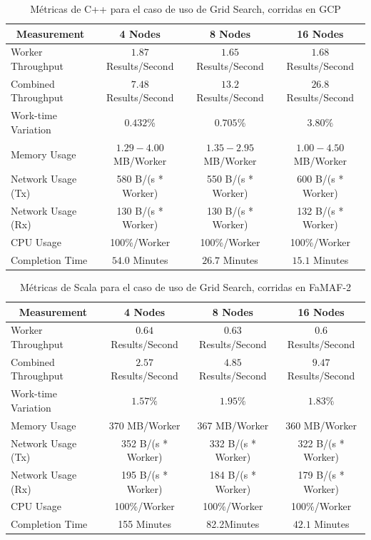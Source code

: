 \documentclass[11pt]{article}
\newcommand{\gscap}[2]{\caption{Métricas de #1 para el caso de uso de Grid Search, corridas en #2}}
\begin{document}
\begin{table}[H]
\centering
\begin{tabular}{|l|c|c|c|}
\hline
\multicolumn{1}{|c|}{Measurement} & 4 Nodes & 8 Nodes & 16 Nodes \\ \hline
Worker Throughput & $1.87$ Results/Second & $1.65$ Results/Second & $1.68$ Results/Second \\ \hline
Combined Throughput & $7.48$ Results/Second & $13.2$  Results/Second & $26.8$ Results/Second \\ \hline
Work-time Variation & $0.432$\% & $0.705$\% & $3.80\%$\\ \hline
Memory Usage & $1.29-4.00$ MB/Worker & $1.35-2.95$ MB/Worker & $1.00-4.50$ MB/Worker \\ \hline
Network Usage (Tx) & 580 B/(s * Worker) & 550 B/(s * Worker) & 600 B/(s * Worker) \\ \hline
Network Usage (Rx) & 130 B/(s * Worker) & 130 B/(s * Worker) & 132 B/(s * Worker) \\ \hline
CPU Usage & 100\%/Worker & 100\%/Worker & 100\%/Worker \\ \hline
Completion Time & $54.0$ Minutes & $26.7$ Minutes & $15.1$ Minutes \\ \hline
\end{tabular}
\gscap{C++}{GCP}
\end{table}

\begin{table}[H]
\centering
\begin{tabular}{|l|c|c|c|}
\hline
\multicolumn{1}{|c|}{Measurement} & 4 Nodes & 8 Nodes & 16 Nodes \\ \hline
Worker Throughput & $0.64$ Results/Second & $0.63$ Results/Second & $0.6$ Results/Second \\ \hline
Combined Throughput & $2.57$ Results/Second & $4.85$ Results/Second & $9.47$ Results/Second \\ \hline
Work-time Variation & $1.57\%$& $1.95\%$& $1.83\%$\\ \hline
Memory Usage & 370 MB/Worker & 367 MB/Worker & 360 MB/Worker \\ \hline
Network Usage (Tx) & 352 B/(s * Worker) & 332 B/(s * Worker) & 322 B/(s * Worker) \\ \hline
Network Usage (Rx) & 195 B/(s * Worker) & 184 B/(s * Worker) & 179 B/(s * Worker) \\ \hline
CPU Usage & 100\%/Worker & 100\%/Worker & 100\%/Worker \\ \hline
Completion Time & 155 Minutes & 82.2Minutes & $42.1$ Minutes \\ \hline
\end{tabular}
\gscap{Scala}{FaMAF-2}
\end{table}
\end{document}
